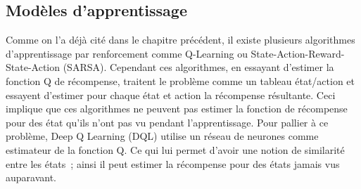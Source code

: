 \subsection{Modèles d'apprentissage}
Comme on l'a déjà cité dans le chapitre précédent, il existe plusieurs algorithmes d'apprentissage par renforcement comme Q-Learning ou State-Action-Reward-State-Action (SARSA)\cite{Rummery1994}. Cependant ces algorithmes, en essayant d'estimer la fonction Q de récompense, traitent le problème comme un tableau état/action et essayent d'estimer pour chaque état et action la récompense résultante. Ceci implique que ces algorithmes ne peuvent pas estimer la fonction de récompense pour des état qu'ils n'ont pas vu pendant l'apprentissage. Pour pallier à ce problème, Deep Q Learning (DQL)\cite{Mnih2015} utilise un réseau de neurones comme estimateur de la fonction Q. Ce qui lui permet d'avoir une notion de similarité entre les états ; ainsi il peut estimer la récompense pour des états jamais vus auparavant.
